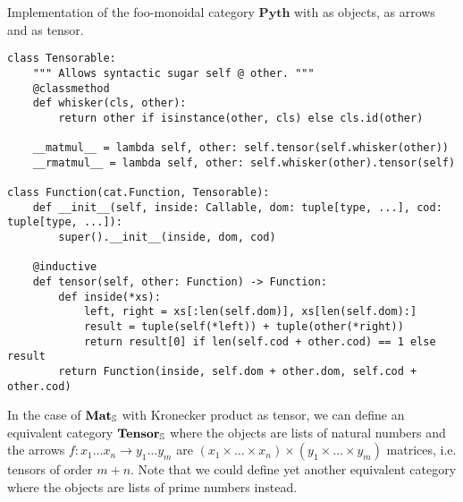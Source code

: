 \begin{python}\label{listing:monoidal.Function}
{\normalfont Implementation of the foo-monoidal category $\mathbf{Pyth}$ with  as objects,  as arrows and  as tensor.}

\begin{verbatim}
class Tensorable:
    """ Allows syntactic sugar self @ other. """
    @classmethod
    def whisker(cls, other):
        return other if isinstance(other, cls) else cls.id(other)

    __matmul__ = lambda self, other: self.tensor(self.whisker(other))
    __rmatmul__ = lambda self, other: self.whisker(other).tensor(self)

class Function(cat.Function, Tensorable):
    def __init__(self, inside: Callable, dom: tuple[type, ...], cod: tuple[type, ...]):
        super().__init__(inside, dom, cod)

    @inductive
    def tensor(self, other: Function) -> Function:
        def inside(*xs):
            left, right = xs[:len(self.dom)], xs[len(self.dom):]
            result = tuple(self(*left)) + tuple(other(*right))
            return result[0] if len(self.cod + other.cod) == 1 else result
        return Function(inside, self.dom + other.dom, self.cod + other.cod)
\end{verbatim}
\end{python}

In the case of $\mathbf{Mat}_\S$ with Kronecker product as tensor, we can define an equivalent category $\mathbf{Tensor}_\S$ where the objects are lists of natural numbers and the arrows $f : x_1 \dots x_n \to y_1 \dots y_m$ are $(x_1 \times \dots \times x_n) \times (y_1 \times \dots \times y_m)$ matrices, i.e. tensors of order $m + n$.
Note that we could define yet another equivalent category where the objects are lists of prime numbers instead.


